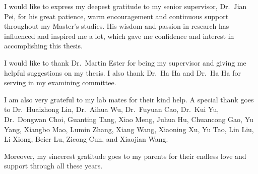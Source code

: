 
%
%

I would like to express my deepest gratitude to my senior supervisor, Dr.~Jian Pei, for his great patience, warm encouragement and continuous support throughout my Master's studies. His wisdom and passion in research has influenced and inspired me a lot, which gave me confidence and interest in accomplishing this thesis. 

I would like to thank Dr.~Martin Ester for being my supervisor and giving me helpful suggestions on my thesis. I also thank Dr.~Ha Ha and Dr.~Ha Ha for serving in my examining committee.  

I am also very grateful to my lab mates for their kind help. A special thank goes to Dr.~Huaizhong Lin, Dr.~Aihua Wu, Dr.~Fuyuan Cao, Dr.~Kui Yu,  Dr.~Dongwan Choi, Guanting Tang, Xiao Meng, Juhua Hu, Chuancong Gao, Yu Yang, Xiangbo Mao, Lumin Zhang, Xiang Wang, Xiaoning Xu, Yu Tao, Lin Liu, Li Xiong, Beier Lu, Zicong Cun, and Xiaojian Wang.

Moreover, my sincerest gratitude goes to my parents for their endless love and support through all these years.






